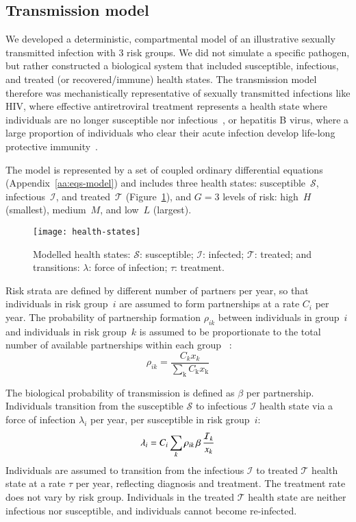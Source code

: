 \subsection{Transmission model}\label{ss:model-sim}
We developed a deterministic, compartmental model of an illustrative
sexually transmitted infection with 3 risk groups.
We did not simulate a specific pathogen, but rather constructed a biological system
that included susceptible, infectious, and treated (or recovered/immune) health states.
The transmission model therefore was mechanistically representative of
sexually transmitted infections like
HIV, where effective antiretroviral treatment represents a health state where
individuals are no longer susceptible nor infectious~\citep{Maartens2014}, or
hepatitis B virus, where a large proportion of individuals who clear their acute infection
develop life-long protective immunity~\citep{Ganem2004}.
\par
The model is represented by a set of coupled ordinary differential equations
(Appendix~\ref{aa:eqs-model}) and includes
three health states:
susceptible~$\mathcal{S}$, infectious~$\mathcal{I}$, and treated~$\mathcal{T}$
(Figure~\ref{fig:health-states}),
and $G = 3$ levels of risk:
high~$H$ (smallest), medium~$M$, and low~$L$ (largest).
\begin{figure}
  \centerline{\texttt{[image: health-states]}}
  \caption{Modelled health states:
    $\mathcal{S}$: susceptible;
    $\mathcal{I}$: infected;
    $\mathcal{T}$: treated;
    and transitions:
    $\lambda$: force of infection;
    $\tau$: treatment.}
  \label{fig:health-states}
\end{figure}
Risk strata are defined by different number of partners per year,
so that individuals in risk group~$i$ are assumed to
form partnerships at a rate $C_{i}$ per year.
The probability of partnership formation $\rho_{ik}$ between individuals in group~$i$
and individuals in risk group~$k$ is assumed to be
proportionate to the total number of available partnerships within each group%
~\cite{Garnett1994}:
\begin{equation}
\rho_{ik} = \frac
{C_k x_k}
{\sum_{\mathrm{k}}C_{\mathrm{k}} x_{\mathrm{k}}}
\label{eq:rho}
\end{equation}
\par
The biological probability of transmission is defined as $\beta$ per partnership.
Individuals transition from the
susceptible $\mathcal{S}$ to infectious $\mathcal{I}$ health state
via a force of infection $\lambda_i$ per year, per susceptible in risk group~$i$:
\begin{equation}
\lambda_{i} =
C_{i} \sum_k \rho_{ik} \thinspace  \beta \thinspace \frac{\mathcal{I}_k}{x_k}
\label{eq:foi}
\end{equation}
Individuals are assumed to transition from the
infectious $\mathcal{I}$ to treated $\mathcal{T}$ health state
at a rate $\tau$ per year, reflecting diagnosis and treatment.
The treatment rate does not vary by risk group.
Individuals in the treated $\mathcal{T}$ health state are neither infectious nor susceptible,
and individuals cannot become re-infected.
